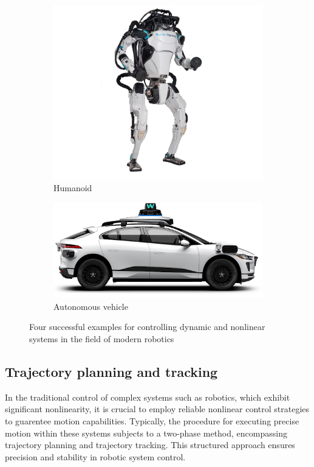 \begin{figure}[H]
    \begin{subfigure}[b]{0.45\textwidth}
        \includegraphics[width=\textwidth]{figures/humanoid.jpg}
        \caption{Humanoid}
        \label{fig:image3}
    \end{subfigure}
    \hfill
    \begin{subfigure}[b]{0.45\textwidth}
        \includegraphics[width=\textwidth]{figures/waymo.png}
        \caption{Autonomous vehicle}
        \label{fig:image4}
    \end{subfigure}
    \caption{Four successful examples for controlling dynamic and nonlinear systems in the field of modern robotics}
    \label{fig:four_images}
\end{figure}

\subsection{Trajectory planning and tracking}
In the traditional control of complex systems such as robotics, which exhibit significant nonlinearity, it is crucial to employ reliable nonlinear control strategies to guarentee motion capabilities. Typically, the procedure for executing precise motion within these systems subjects to a two-phase method\cite{biagiotti2008trajectory}, encompassing trajectory planning and trajectory tracking. This structured approach ensures precision and stability in robotic system control.

